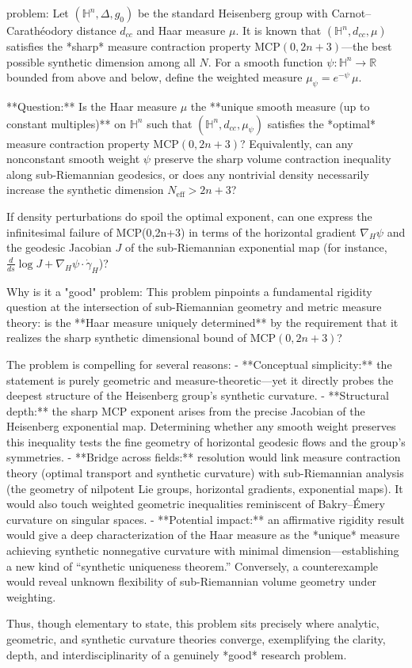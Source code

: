 problem:  
Let \((\mathbb{H}^n,\Delta,g_0)\) be the standard Heisenberg group with Carnot–Carathéodory distance \(d_{cc}\) and Haar measure \(\mu\). It is known that \((\mathbb{H}^n,d_{cc},\mu)\) satisfies the *sharp* measure contraction property \(\mathrm{MCP}(0,2n+3)\)—the best possible synthetic dimension among all \(N\).  
For a smooth function \(\psi:\mathbb{H}^n\to\mathbb{R}\) bounded from above and below, define the weighted measure \(\mu_\psi = e^{-\psi}\,\mu\).  

**Question:**  
Is the Haar measure \(\mu\) the **unique smooth measure (up to constant multiples)** on \(\mathbb{H}^n\) such that \((\mathbb{H}^n,d_{cc},\mu_\psi)\) satisfies the *optimal* measure contraction property \(\mathrm{MCP}(0,2n+3)\)?  
Equivalently, can any nonconstant smooth weight \(\psi\) preserve the sharp volume contraction inequality along sub-Riemannian geodesics, or does any nontrivial density necessarily increase the synthetic dimension \(N_{\mathrm{eff}}>2n+3\)?  

If density perturbations do spoil the optimal exponent, can one express the infinitesimal failure of MCP(0,2n+3) in terms of the horizontal gradient \(\nabla_H\psi\) and the geodesic Jacobian \(J\) of the sub-Riemannian exponential map (for instance, \( \frac{d}{ds}\log J + \nabla_H\psi\cdot \dot{\gamma}_H  \))?  

Why is it a "good" problem:  
This problem pinpoints a fundamental rigidity question at the intersection of sub-Riemannian geometry and metric measure theory: is the **Haar measure uniquely determined** by the requirement that it realizes the sharp synthetic dimensional bound of \(\mathrm{MCP}(0,2n+3)\)?  

The problem is compelling for several reasons:  
- **Conceptual simplicity:** the statement is purely geometric and measure-theoretic—yet it directly probes the deepest structure of the Heisenberg group’s synthetic curvature.  
- **Structural depth:** the sharp MCP exponent arises from the precise Jacobian of the Heisenberg exponential map. Determining whether any smooth weight preserves this inequality tests the fine geometry of horizontal geodesic flows and the group’s symmetries.  
- **Bridge across fields:** resolution would link measure contraction theory (optimal transport and synthetic curvature) with sub-Riemannian analysis (the geometry of nilpotent Lie groups, horizontal gradients, exponential maps). It would also touch weighted geometric inequalities reminiscent of Bakry–Émery curvature on singular spaces.  
- **Potential impact:** an affirmative rigidity result would give a deep characterization of the Haar measure as the *unique* measure achieving synthetic nonnegative curvature with minimal dimension—establishing a new kind of “synthetic uniqueness theorem.” Conversely, a counterexample would reveal unknown flexibility of sub-Riemannian volume geometry under weighting.  

Thus, though elementary to state, this problem sits precisely where analytic, geometric, and synthetic curvature theories converge, exemplifying the clarity, depth, and interdisciplinarity of a genuinely *good* research problem.